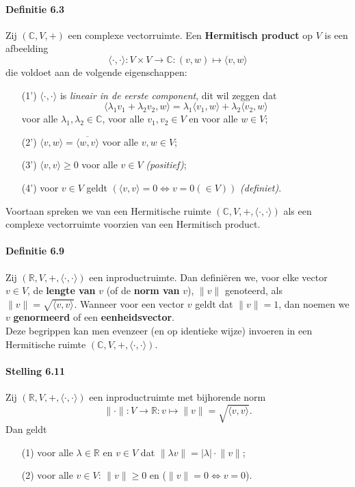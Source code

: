 \documentclass[11pt,oneside,a4paper]{article}
\begin{document}
	\paragraph{Definitie 6.3}
		Zij $(\mathbb{C},V,+)$ een complexe vectorruimte. Een \textbf{Hermitisch product} op $V$ is een afbeelding $$\langle \cdot , \cdot \rangle: V \times V \to \mathbb{C}: (v,w)\mapsto \langle v,w\rangle $$ die voldoet aan de volgende eigenschappen:
		\begin{itemize}
			\item[(1')]  $\langle \cdot , \cdot \rangle$ is \textit{lineair in de eerste component}, dit wil zeggen dat $$\langle \lambda_1v_1+\lambda_2v_2 , w \rangle = \lambda_1\langle v_1 , w \rangle + \lambda_2 \langle v_2 , w \rangle$$ voor alle $\lambda_1 , \lambda_2 \in \mathbb{C}$, voor alle $v_1, v_2 \in V$ en voor alle $w \in V$;
			\item[(2')] $\langle v , w \rangle = \overline{\langle w , v \rangle}$ voor alle $v,w \in V$;
			\item[(3')] $\langle v , v \rangle \ge 0$ voor alle $v \in V$ \textit{(positief)};
			\item[(4')] voor $v\in V$ geldt
			$(\langle v , v \rangle = 0 \Leftrightarrow v = 0 (\in V))$ \textit{(definiet)}.
		\end{itemize}
		Voortaan spreken we van een Hermitische ruimte $(\mathbb{C},V,+, \langle \cdot , \cdot \rangle)$ als een complexe vectorruimte voorzien van een Hermitisch product.
	\paragraph{Definitie 6.9}
		Zij $(\mathbb{R},V,+, \langle \cdot , \cdot \rangle)$ een inproductruimte. Dan definiëren we, voor elke vector $v\in V$, de \textbf{lengte van} $v$ (of de \textbf{norm van} $v$), $\lVert v \rVert$ genoteerd, als $\lVert v \rVert = \sqrt{\langle v , v \rangle}$. Wanneer voor een vector $v$ geldt dat $\lVert v \rVert = 1$, dan noemen we $v$ \textbf{genormeerd} of een \textbf{eenheidsvector}. \\ Deze begrippen kan men evenzeer (en op identieke wijze) invoeren in een Hermitische ruimte $(\mathbb{C},V,+, \langle \cdot , \cdot \rangle)$.
	\paragraph{Stelling 6.11}	
		Zij $(\mathbb{R},V,+, \langle \cdot , \cdot \rangle)$ een inproductruimte met bijhorende norm $$\lVert \cdot \rVert: V \to \mathbb{R}: v \mapsto \lVert v \rVert = \sqrt{\langle v , v \rangle}.$$ Dan geldt
		\begin{itemize}
			\item[(1)] voor alle $\lambda \in \mathbb{R}$ en $v \in V$ dat $\lVert \lambda v \rVert = |\lambda|\cdot \lVert v \rVert$;
			\item[(2)] voor alle $v \in V$: $\lVert v \rVert \ge 0$ en ($\lVert v \rVert = 0 \Leftrightarrow v = 0$).
		\end{itemize}
\end{document}
